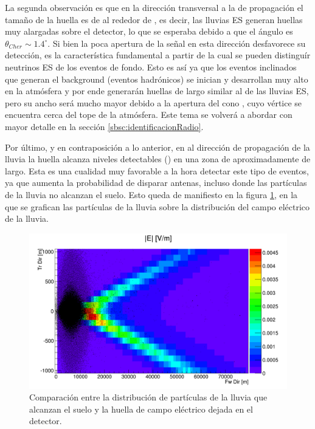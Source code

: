 	La segunda observación es que en la dirección transversal a la de propagación el tamaño de la huella es de al rededor de , es decir, las lluvias ES generan huellas muy alargadas sobre el detector, lo que se esperaba debido a que el \'angulo \cher{} es $\theta_{Cher}\sim1.4^\circ$.
	Si bien la poca apertura de la se\~nal en esta direcci\'on desfavorece su detecci\'on, es la característica fundamental a partir de la cual se pueden distinguír neutrinos ES de los eventos de fondo. 
	Esto es as\'i ya que los eventos inclinados que generan el background (eventos hadr\'onicos) se inician y desarrollan muy alto en la atmósfera y por ende generarán huellas de largo similar al de las lluvias ES, pero su ancho ser\'a mucho mayor debido a la apertura del cono \cher{}, cuyo v\'ertice se encuentra cerca del tope de la atm\'osfera.
	Este tema se volverá a abordar con mayor detalle en la sección \ref{sbsc:identificacionRadio}.
	 
	Por último, y en contraposición a lo anterior, en al dirección de propagación de la lluvia la huella alcanza niveles detectables () en una zona de aproximadamente  de largo.
	Esta es una cualidad muy favorable a la hora detectar este tipo de eventos, ya que aumenta la probabilidad de disparar antenas, incluso donde las part\'iculas de la lluvia no alcanzan el suelo.
	Esto queda de manifiesto en la figura \ref{fig:sim_foot_y_part}, en la que se grafican las part\'iculas de la lluvia sobre la distribuci\'on del campo el\'ectrico de la lluvia.
	\begin{figure}[ht!]
		\centering
		\includegraphics[width=\textwidth]{./fig/simulacionRadio/foorPrint_Test_18_89-5_90_25_1238_E_particles}
		\caption{\label{fig:sim_foot_y_part}
		Comparaci\'on entre la distribuci\'on de part\'iculas de la lluvia que alcanzan el suelo y la huella de campo el\'ectrico dejada en el detector.
		}
	\end{figure}
	
